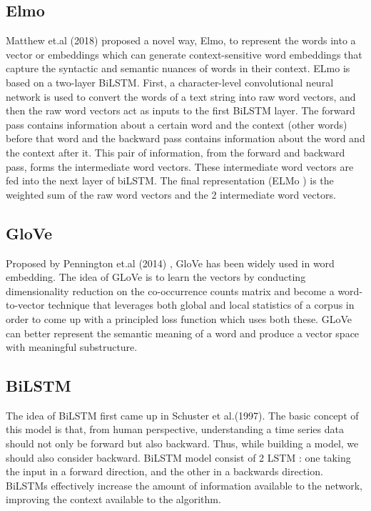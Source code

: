 \documentclass[11pt]{article}
\begin{document}
\subsection{Elmo \cite{peters-etal-2018-deep} }
Matthew et.al (2018) \cite{peters-etal-2018-deep} proposed a novel way, Elmo, to represent the words into a vector or embeddings which can generate context-sensitive word embeddings that capture the syntactic and semantic nuances of words in their context. 
ELmo \cite{peters-etal-2018-deep}  is based on a two-layer BiLSTM\cite{650093}. First, a character-level convolutional neural network is used to convert the words of a text string into raw word vectors, and then the raw word vectors act as inputs to the first BiLSTM\cite{650093} layer. The forward pass contains information about a certain word and the context (other words) before that word and the backward pass contains information about the word and the context after it. This pair of information, from the forward and backward pass, forms the intermediate word vectors.
These intermediate word vectors are fed into the next layer of biLSTM\cite{650093}. The final representation (ELMo \cite{peters-etal-2018-deep} ) is the weighted sum of the raw word vectors and the 2 intermediate word vectors.
\subsection{GloVe\cite{pennington2014glove}}
Proposed by Pennington et.al (2014) \cite{pennington2014glove}, GloVe has been widely used in word embedding. The idea of GLoVe\cite{pennington2014glove} is to learn the vectors by conducting dimensionality reduction on the co-occurrence counts matrix and become a word-to-vector technique that leverages both global and local statistics of a corpus in order to come up with a principled loss function which uses both these. 
GLoVe\cite{pennington2014glove} can better represent the semantic meaning of a word and produce a vector space with meaningful substructure.
\subsection{BiLSTM\cite{650093}}
The idea of BiLSTM first came up in Schuster et al.(1997)\cite{650093}. The basic concept of this model is that, from human perspective, understanding a time series data should not only be forward but also backward. Thus, while building a model, we should also consider backward. BiLSTM\cite{650093} model consist of 2 LSTM \cite{6795963} : one taking the input in a forward direction, and the other in a backwards direction. BiLSTMs\cite{650093} effectively increase the amount of information available to the network, improving the context available to the algorithm.
\end{document}
